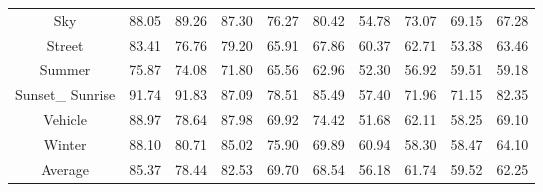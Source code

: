 \begin{sidewaystable}
\begin{tabular}{|c| p{2cm}| p{2cm}| p{2cm}| p{2cm}| p{2cm}|c|c|c|c|}
Sky & 88.05 & 89.26 & 87.30 & 76.27 & 80.42 & 54.78 & 73.07 & 69.15 & 67.28\\  [1ex]
Street & 83.41 & 76.76 & 79.20 & 65.91 & 67.86 & 60.37 & 62.71 & 53.38 & 63.46\\  [1ex]
Summer & 75.87 & 74.08 & 71.80 & 65.56 & 62.96 & 52.30 & 56.92 & 59.51 & 59.18\\  [1ex]
Sunset\_ Sunrise & 91.74 & 91.83 & 87.09 & 78.51 & 85.49 & 57.40 & 71.96 & 71.15 & 82.35\\  [1ex]
Vehicle & 88.97 & 78.64 & 87.98 & 69.92 & 74.42 & 51.68 & 62.11 & 58.25 & 69.10\\  [1ex]
Winter & 88.10 & 80.71 & 85.02 & 75.90 & 69.89 & 60.94 & 58.30 & 58.47 & 64.10 \\  [1ex] \hline
Average & 85.37 & 78.44 & 82.53 & 69.70 & 68.54 & 56.18 & 61.74 & 59.52 & 62.25\\  [1ex] \hline
\end{tabular}
\label{table:ImageCLEFPrecision} %
\end{sidewaystable}

